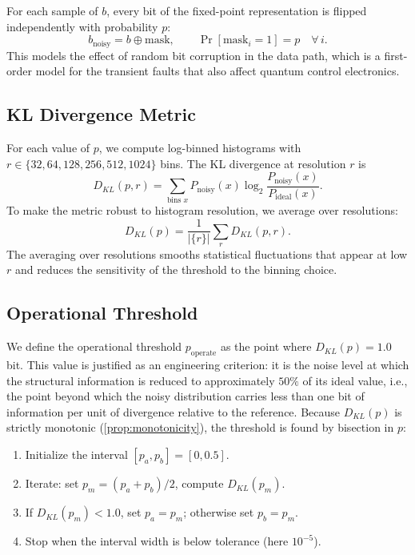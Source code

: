 \documentclass[12pt,a4paper,oneside]{book}
\theoremstyle{plain}
\theoremstyle{definition}
\theoremstyle{remark}
\begin{document}
For each sample of $b$, every bit of the fixed-point representation is flipped independently with probability $p$:
\begin{equation}
    \label{eq:bitflip}
    b_{\text{noisy}} = b \oplus \text{mask}, \qquad \Pr[\text{mask}_i = 1] = p \quad \forall\, i.
\end{equation}
This models the effect of random bit corruption in the data path, which is a first-order model for the transient faults that also affect quantum control electronics.

\subsection{KL Divergence Metric}

For each value of $p$, we compute log-binned histograms with $r \in \{32, 64, 128, 256, 512, 1024\}$ bins. The KL divergence at resolution $r$ is
\begin{equation}
    D_{KL}(p, r) = \sum_{\text{bins } x} P_{\text{noisy}}(x) \log_2 \frac{P_{\text{noisy}}(x)}{P_{\text{ideal}}(x)}.
\end{equation}
To make the metric robust to histogram resolution, we average over resolutions:
\begin{equation}
    D_{KL}(p) = \frac{1}{|\{r\}|} \sum_{r} D_{KL}(p, r).
\end{equation}
The averaging over resolutions smooths statistical fluctuations that appear at low $r$ and reduces the sensitivity of the threshold to the binning choice.

\subsection{Operational Threshold}
\label{sec:threshold}

We define the operational threshold $p_{\text{operate}}$ as the point where $D_{KL}(p) = 1.0$ bit. This value is justified as an engineering criterion: it is the noise level at which the structural information is reduced to approximately $50\%$ of its ideal value, i.e., the point beyond which the noisy distribution carries less than one bit of information per unit of divergence relative to the reference. Because $D_{KL}(p)$ is strictly monotonic (\cref{prop:monotonicity}), the threshold is found by bisection in $p$:
\begin{enumerate}[itemsep=2pt]
    \item Initialize the interval $[p_a, p_b] = [0, 0.5]$.
    \item Iterate: set $p_m = (p_a + p_b)/2$, compute $D_{KL}(p_m)$.
    \item If $D_{KL}(p_m) < 1.0$, set $p_a = p_m$; otherwise set $p_b = p_m$.
    \item Stop when the interval width is below tolerance (here $10^{-5}$).
\end{enumerate}
\end{document}
